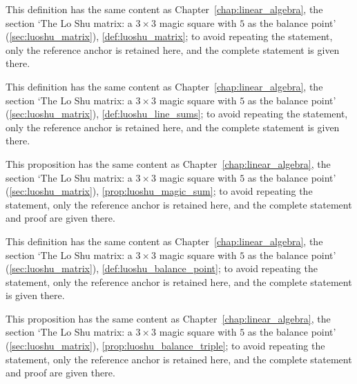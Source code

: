 \begin{definition}\label{def:luoshu_matrix_yijing}
This definition has the same content as Chapter~\ref{chap:linear_algebra}, the section `The Lo Shu matrix: a $3\times 3$ magic square with $5$ as the balance point' (\cref{sec:luoshu_matrix}), \cref{def:luoshu_matrix}; to avoid repeating the statement, only the reference anchor is retained here, and the complete statement is given there.
\end{definition}

\begin{definition}\label{def:luoshu_line_sums_yijing}
This definition has the same content as Chapter~\ref{chap:linear_algebra}, the section `The Lo Shu matrix: a $3\times 3$ magic square with $5$ as the balance point' (\cref{sec:luoshu_matrix}), \cref{def:luoshu_line_sums}; to avoid repeating the statement, only the reference anchor is retained here, and the complete statement is given there.
\end{definition}

\begin{proposition}\label{prop:luoshu_magic_sum_yijing}
This proposition has the same content as Chapter~\ref{chap:linear_algebra}, the section `The Lo Shu matrix: a $3\times 3$ magic square with $5$ as the balance point' (\cref{sec:luoshu_matrix}), \cref{prop:luoshu_magic_sum}; to avoid repeating the statement, only the reference anchor is retained here, and the complete statement and proof are given there.
\end{proposition}

\begin{definition}\label{def:luoshu_balance_point_yijing}
This definition has the same content as Chapter~\ref{chap:linear_algebra}, the section `The Lo Shu matrix: a $3\times 3$ magic square with $5$ as the balance point' (\cref{sec:luoshu_matrix}), \cref{def:luoshu_balance_point}; to avoid repeating the statement, only the reference anchor is retained here, and the complete statement is given there.
\end{definition}

\begin{proposition}\label{prop:luoshu_balance_triple_yijing}
This proposition has the same content as Chapter~\ref{chap:linear_algebra}, the section `The Lo Shu matrix: a $3\times 3$ magic square with $5$ as the balance point' (\cref{sec:luoshu_matrix}), \cref{prop:luoshu_balance_triple}; to avoid repeating the statement, only the reference anchor is retained here, and the complete statement and proof are given there.
\end{proposition}

